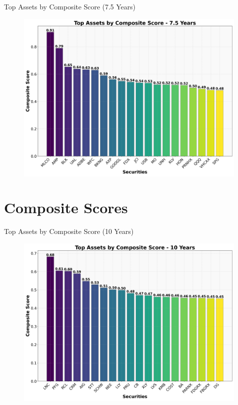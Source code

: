 \documentclass{beamer}
\begin{document}
\begin{frame}{Top Assets by Composite Score (7.5 Years)}
    \begin{figure}
        \centering
        \includegraphics[width=0.9\linewidth]{../Figures/top_assets_composite_score_7_5_years.png}
    \end{figure}
\end{frame}

\section{Composite Scores}
\begin{frame}{Top Assets by Composite Score (10 Years)}
    \begin{figure}
        \centering
        \includegraphics[width=0.9\linewidth]{../Figures/top_assets_composite_score_10_years.png}
    \end{figure}
\end{frame}
\end{document}
